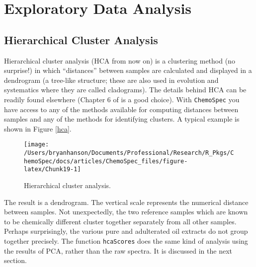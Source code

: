 \documentclass[letter,10pt,twocolumn,twoside,printwatermark=false]{pinp}
\begin{document}
\hypertarget{exploratory-data-analysis}{%
\section{Exploratory Data Analysis}\label{exploratory-data-analysis}}

\hypertarget{hierarchical-cluster-analysis}{%
\subsection{Hierarchical Cluster
Analysis}\label{hierarchical-cluster-analysis}}

\label{sec-hca} Hierarchical cluster analysis (HCA from now on) is a
clustering method (no surprise!) in which ``distances'' between samples
are calculated and displayed in a dendrogram (a tree-like structure;
these are also used in evolution and systematics where they are called
cladograms). The details behind HCA can be readily found elsewhere
(Chapter 6 of \cite{Filzmoser2009} is a good choice). With
\texttt{ChemoSpec} you have access to any of the methods available for
computing distances between samples and any of the methods for
identifying clusters. A typical example is shown in Figure \ref{hca}.

\begin{Shaded}
\begin{Highlighting}[]
\StringTok{ }
\end{Highlighting}
\end{Shaded}

\begin{figure}

{\centering \texttt{[image: /Users/bryanhanson/Documents/Professional/Research/R\_Pkgs/ChemoSpec/docs/articles/ChemoSpec\_files/figure-latex/Chunk19-1]} 

}

\caption{\label{hca}Hierarchical cluster analysis.}\label{fig:Chunk19}
\end{figure}

The result is a dendrogram. The vertical scale represents the numerical
distance between samples. Not unexpectedly, the two reference samples
which are known to be chemically different cluster together separately
from all other samples. Perhaps surprisingly, the various pure and
adulterated oil extracts do not group together precisely. The function
\texttt{hcaScores} does the same kind of analysis using the results of
PCA, rather than the raw spectra. It is discussed in the next section.
\end{document}
